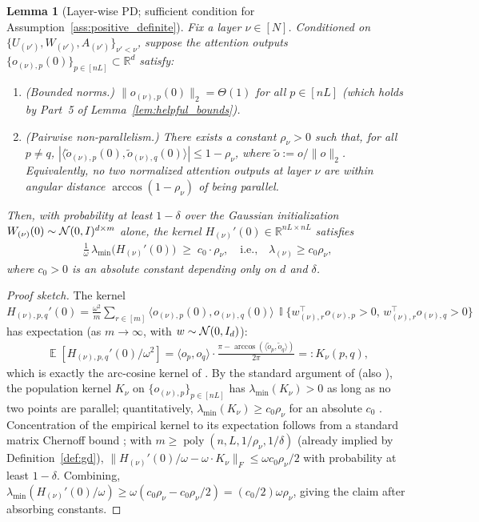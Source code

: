 \documentclass[11pt]{article}
\let\citet\citep
\theoremstyle{plain}
\newtheorem{lemma}[theorem]{Lemma}
\newcommand{\wt}{\widetilde}
\newcommand{\R}{\mathbb{R}}
\renewcommand{\tilde}{\wt}
\DeclareMathOperator*{\E}{{\mathbb{E}}}
\DeclareMathOperator{\poly}{poly}
\DeclareMathOperator{\I}{\mathbb{I}}
\begin{document}
\begin{lemma}[Layer-wise PD; sufficient condition for Assumption~\ref{ass:positive_definite}]\label{lem:pd_sufficient}
    Fix a layer $\nu\in[N]$. Conditioned on $\{U_{(\nu')}, W_{(\nu')}, A_{(\nu')}\}_{\nu'<\nu}$, suppose the attention outputs $\{o_{(\nu),p}(0)\}_{p\in[nL]}\subset \R^d$ satisfy:
    \begin{enumerate}
        \item[\bf (P1)] (Bounded norms.) $\|o_{(\nu),p}(0)\|_2 = \Theta(1)$ for all $p\in[nL]$ (which holds by Part~5 of Lemma~\ref{lem:helpful_bounds}).
        \item[\bf (P2)] (Pairwise non-parallelism.) There exists a constant $\rho_\nu > 0$ such that, for all $p\ne q$, $|\langle \tilde o_{(\nu),p}(0), \tilde o_{(\nu),q}(0)\rangle| \leq 1 - \rho_\nu$, where $\tilde o := o/\|o\|_2$. Equivalently, no two normalized attention outputs at layer $\nu$ are within angular distance $\arccos(1-\rho_\nu)$ of being parallel.
    \end{enumerate}
    Then, with probability at least $1-\delta$ over the Gaussian initialization $W_{(\nu)}(0)\sim {\cal N}(0, I)^{d\times m}$ alone, the kernel $H_{(\nu)}'(0)\in\R^{nL\times nL}$ satisfies
    \begin{align*}
        \frac{1}{\omega}\,\lambda_{\min}\big(H_{(\nu)}'(0)\big) \;\ge\; c_0 \cdot \rho_\nu, \quad \text{i.e.,}\quad \lambda_{(\nu)} \ge c_0 \rho_\nu,
    \end{align*}
    where $c_0>0$ is an absolute constant depending only on $d$ and $\delta$.
\end{lemma}

\begin{proof}[Proof sketch]
    The kernel $H_{(\nu),p,q}'(0) = \frac{\omega^2}{m}\sum_{r\in[m]} \langle o_{(\nu),p}(0), o_{(\nu),q}(0)\rangle\,\I\{w_{(\nu),r}^\top o_{(\nu),p} > 0,\,w_{(\nu),r}^\top o_{(\nu),q} > 0\}$ has expectation (as $m\to\infty$, with $w\sim {\cal N}(0,I_d)$):
    \begin{align*}
        \E[H_{(\nu),p,q}'(0)/\omega^2] = \langle o_p, o_q\rangle\cdot\frac{\pi - \arccos(\langle\tilde o_p,\tilde o_q\rangle)}{2\pi} =: K_\nu(p,q),
    \end{align*}
    which is exactly the arc-cosine kernel of \citet{cs09}. By the standard argument of \citet[Proposition 1]{dzps19} (also \citealp{dllw19, os20}), the population kernel $K_\nu$ on $\{o_{(\nu),p}\}_{p\in[nL]}$ has $\lambda_{\min}(K_\nu) > 0$ as long as no two points are parallel; quantitatively, $\lambda_{\min}(K_\nu) \ge c_0\rho_\nu$ for an absolute $c_0$ \citep[Lemma 3.1]{dzps19}. Concentration of the empirical kernel to its expectation follows from a standard matrix Chernoff bound \citep{sy19}; with $m\ge \poly(n,L,1/\rho_\nu,1/\delta)$ (already implied by Definition~\ref{def:gd}), $\|H_{(\nu)}'(0)/\omega - \omega\cdot K_\nu\|_F \le \omega c_0\rho_\nu/2$ with probability at least $1-\delta$. Combining,
    $\lambda_{\min}(H_{(\nu)}'(0)/\omega) \ge \omega(c_0\rho_\nu - c_0\rho_\nu/2) = (c_0/2)\omega\rho_\nu$,
    giving the claim after absorbing constants.
\end{proof}
\end{document}
